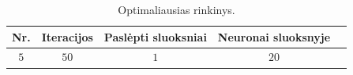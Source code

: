 \begin{table}[H]
    \centering
    \caption{Optimaliausias rinkinys.}
    \begin{tabular}{|c|c|c|c|c|}
        \hline
        \textbf{Nr.} & \textbf{Iteracijos} & \textbf{Paslėpti sluoksniai} & \textbf{Neuronai sluoksnyje} \\
        \hline
        $5$ & $50$  & $1$ & $20$ \\ \hline
    \end{tabular}
    \label{tab:optimaliausias_rinkinys}
\end{table}
